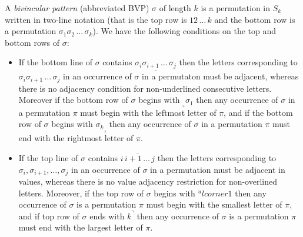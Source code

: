 \documentclass[a4paper]{llncs}
\newcommand{\ptext}{\pi}
\newcommand{\pmotif}{\sigma}
\newcommand{\x}{X}
\newcommand{\y}{Y}
\newcommand{\bmotif}{(\sigma,\x,\y)}
\begin{document}
			
A \emph{bivincular pattern} (abbreviated BVP) $\sigma$
of length $k$ is a permutation in $S_k$ written in
two-line notation 
(that is the top row is $12\,\ldots\,k$ and the bottom row
is a permutation $\sigma_1\sigma_2\,\ldots\,\sigma_k$).
We have the following conditions on the top and bottom rows
of $\sigma$:
\begin{itemize}
	\item
	If the bottom line of $\sigma$ contains
	$\underline{\sigma_i\sigma_{i+1}\,\ldots\,\sigma_j}$
	then the letters corresponding to 
	$\sigma_i\sigma_{i+1}\,\ldots\,\sigma_j$ in an occurrence of
	$\sigma$ in a permutaton must be adjacent, whereas there is
	no adjacency condition for
	non-underlined consecutive letters.
	Moreover if the bottom row of $\sigma$ begins with
	$_\llcorner{\sigma_1}$ then any occurrence of $\sigma$ 
	in a permutation $\pi$ must begin with the leftmost 
	letter of $\pi$,
	and 
	if the bottom row of $\sigma$ begins with
	${\sigma_k}_\lrcorner$ then any occurrence of $\sigma$ 
	in a permutation $\pi$ must end with the rightmost 
	letter of $\pi$.
	\item
	If the top line of $\sigma$ contains
	$\overline{i\,i+1\,\ldots\,j}$ then the letters corresponding to
	$\sigma_i, \sigma_{i+1}, \ldots, \sigma_j$ in an
	occurrence of $\sigma$ in a permutation must be adjacent in values,
	whereas there is no value adjacency restriction for non-overlined 
	letters.
	Moreover, if the top row of $\sigma$ begins with
	$^ulcorner{1}$ then
	any occurrence of $\sigma$ is a permutation $\pi$ must begin with
	the smallest letter of $\pi$, and
	if top row of $\sigma$ ends with $k^\urcorner$ then
	any occurrence of $\sigma$ is a permutation $\pi$ must end with
	the largest letter of $\pi$.
\end{itemize}
\end{document}
